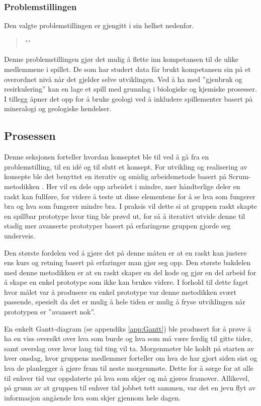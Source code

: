 \subsubsection{Problemstillingen}\label{sec:problemstilling}
Den valgte problemstillingen er gjengitt i sin helhet nedenfor.
\begin{quotation}
\large\emph{""}
\end{quotation}
Denne problemstillingen gjør det mulig å flette inn kompetansen til de
ulike medlemmene i spillet. De som har studert data får brukt
kompetansen sin på et overordnet nivå når det gjelder selve utviklingen.
Ved å ha med ''gjenbruk og resirkulering'' kan en lage et spill med
grunnlag i biologiske og kjemiske prosesser. I tillegg åpner det opp for å bruke geologi ved å inkludere spillementer basert på mineralogi og geologiske hendelser. 

\subsection{Prosessen}
Denne seksjonen forteller hvordan konseptet ble til ved å gå fra en problemstilling, til en idé og til slutt et konsept. For utvikling og realisering av konsepte ble det benyttet en iterativ og smidig arbeidsmetode \cite{online:agile_manifesto} basert på Scrum-metodikken \cite{Scrum}. Her vil en dele opp arbeidet i mindre, mer håndterlige deler en raskt kan fullføre, for videre å teste ut disse elementene for å se hva som fungerer bra og hva som fungerer mindre bra. I praksis vil dette si at gruppen raskt skapte en spillbar prototype hvor ting ble prøvd ut, for så å iterativt utvide denne til stadig mer avanserte prototyper basert på erfaringene gruppen gjorde seg underveis.

Den største fordelen ved å gjøre det på denne måten er at en raskt kan justere ens kurs og retning basert på erfaringer man gjør seg opp. 
Den største bakdelen med denne metodikken er at en raskt skaper en del kode og gjør en del arbeid for å skape en enkel prototype som ikke kan brukes videre.
I forhold til dette faget hvor målet var å produsere en enkel prototype var denne metodikken svært passende, spesielt da det er mulig å hele tiden er mulig å fryse utviklingen når prototypen er ''avansert nok''.


En enkelt Gantt-diagram (se appendiks \ref{app:Gantt}) ble produsert for å prøve å ha en viss oversikt over hva som burde og hva som må være ferdig til gitte tider, samt overslag over hvor lang tid ting vil ta.
Morgenmøter ble holdt på starten av hver onsdag, hvor gruppens medlemmer forteller om hva de har gjort siden sist og hva de planlegger å gjøre fram til neste morgenmøte. Dette for å sørge for at alle til enhver tid var oppdaterte på hva som skjer og må gjøres framover.
Allikevel, på grunn av at gruppen til enhver tid jobbet tett sammen, var det en jevn flyt av informasjon angående hva som skjer gjennom hele dagen.


